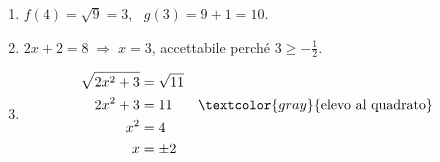 \begin{question}[ID=1.4, subtitle={Composizione di funzioni con radicali}, difficulty=media, tags={funzioni, composizione}]
\begin{explanation}
\begin{enumerate}
    \item $f(4)=\sqrt{9}=3$, \ $g(3)=9+1=10$.
    \item $2x+2=8 \;\Rightarrow\; x=3$, accettabile perché $3\geq-\tfrac12$.
    \item \[\begin{aligned}
    \sqrt{2x^2+3} &= \sqrt{11}\\
    2x^2+3 &= 11 && \textcolor{gray}{\text{elevo al quadrato}}\\
    x^2 &= 4\\
    x &= \pm2
    \end{aligned}\]
\end{enumerate}
\end{explanation}
\end{question}


